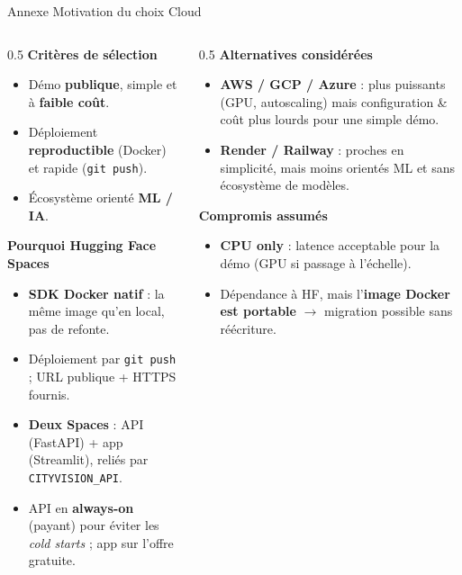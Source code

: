 \documentclass[aspectratio=169,11pt]{beamer}
\newcommand{\emphc}[1]{\textbf{\color{cvblue}#1}}
\newcommand{\code}[1]{\texttt{\small #1}}
\begin{document}
\begin{frame}{Annexe \textbar{} Motivation du choix Cloud}
  \begin{columns}[T]
    \begin{column}{0.5\textwidth}
      \textbf{Critères de sélection}
      \begin{itemize}\footnotesize
        \item Démo \emphc{publique}, simple et à \emphc{faible coût}.
        \item Déploiement \emphc{reproductible} (Docker) et rapide
          (\code{git push}).
        \item Écosystème orienté \emphc{ML / IA}.
      \end{itemize}
      \vspace{0.3em}
      \textbf{Pourquoi \emphc{Hugging Face Spaces}}
      \begin{itemize}\footnotesize
        \item \emphc{SDK Docker natif} : la même image qu'en local, pas de refonte.
        \item Déploiement par \code{git push} ; URL publique + HTTPS fournis.
        \item \emphc{Deux Spaces} : API (FastAPI) + app (Streamlit),
          reliés par \code{CITYVISION\_API}.
        \item API en \emphc{always-on} (payant) pour éviter les \emph{cold starts} ;
          app sur l'offre gratuite.
      \end{itemize}
    \end{column}
    \begin{column}{0.5\textwidth}
      \textbf{Alternatives considérées}
      \begin{itemize}\footnotesize
        \item \emphc{AWS / GCP / Azure} : plus puissants (GPU, autoscaling)
          mais configuration \& coût plus lourds pour une simple démo.
        \item \emphc{Render / Railway} : proches en simplicité, mais moins
          orientés ML et sans écosystème de modèles.
      \end{itemize}
      \vspace{0.3em}
      \textbf{Compromis assumés}
      \begin{itemize}\footnotesize
        \item \emphc{CPU only} : latence acceptable pour la démo
          (GPU si passage à l'échelle).
        \item Dépendance à HF, mais l'\emphc{image Docker est portable}
          $\rightarrow$ migration possible sans réécriture.
      \end{itemize}
    \end{column}
  \end{columns}
\end{frame}
\end{document}
